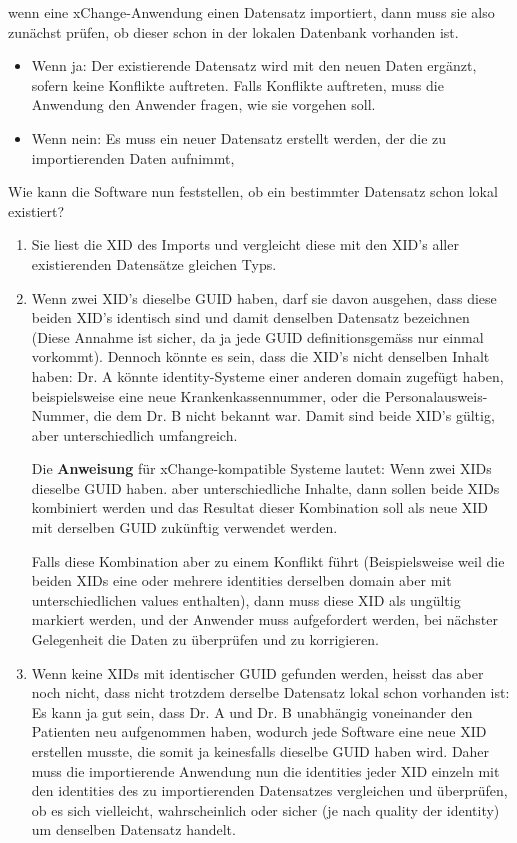 \documentclass[a4paper]{scrartcl}
\begin{document}
wenn eine xChange-Anwendung einen Datensatz importiert, dann muss sie also zunächst prüfen, ob dieser schon in der lokalen Datenbank vorhanden ist.
\begin{itemize}
\item Wenn ja: Der existierende Datensatz wird mit den neuen Daten ergänzt, sofern keine Konflikte auftreten. Falls Konflikte auftreten, muss die Anwendung den Anwender fragen, wie sie vorgehen soll.
\item Wenn nein: Es muss ein neuer Datensatz erstellt werden, der die zu importierenden Daten aufnimmt,
\end{itemize}

Wie kann die Software nun feststellen, ob ein bestimmter Datensatz schon lokal existiert?
\begin{enumerate}
\item Sie liest die XID des Imports und vergleicht diese mit den XID's aller existierenden Datensätze gleichen Typs.
\item Wenn zwei XID's dieselbe GUID haben, darf sie davon ausgehen, dass diese beiden XID's identisch sind und damit denselben Datensatz bezeichnen (Diese Annahme ist sicher, da ja jede GUID definitionsgemäss nur einmal vorkommt). Dennoch könnte es sein, dass die XID's nicht denselben Inhalt haben: Dr. A könnte identity-Systeme einer anderen domain zugefügt haben, beispielsweise eine neue Krankenkassennummer, oder die Personalausweis-Nummer, die dem Dr. B nicht bekannt war. Damit sind beide XID's gültig, aber unterschiedlich umfangreich.
    
    Die \textbf{Anweisung} für xChange-kompatible Systeme lautet: Wenn zwei XIDs dieselbe GUID haben. aber unterschiedliche Inhalte, dann sollen beide XIDs kombiniert werden und das Resultat dieser Kombination soll als neue XID mit derselben GUID zukünftig verwendet werden.
    
    Falls diese Kombination aber zu einem Konflikt führt (Beispielsweise weil die beiden XIDs eine oder mehrere identities derselben domain aber mit unterschiedlichen values enthalten), dann muss diese XID als ungültig markiert werden, und der Anwender muss aufgefordert werden, bei nächster Gelegenheit die Daten zu überprüfen und zu korrigieren.
    
\item Wenn keine XIDs mit identischer GUID gefunden werden, heisst das aber noch nicht, dass nicht trotzdem derselbe Datensatz lokal schon vorhanden ist: Es kann ja gut sein, dass Dr. A und Dr. B unabhängig voneinander den Patienten neu aufgenommen haben, wodurch jede Software eine neue XID erstellen musste, die somit ja keinesfalls dieselbe GUID haben wird.
    Daher muss die importierende Anwendung nun die identities jeder XID einzeln mit den identities des zu importierenden Datensatzes vergleichen und überprüfen, ob es sich vielleicht, wahrscheinlich oder sicher (je nach quality der identity) um denselben Datensatz handelt.
    

\end{enumerate}
\end{document}
